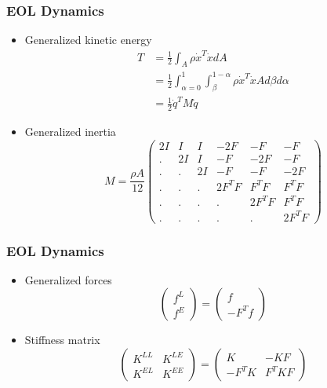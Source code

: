 \documentclass[serif,mathserif, 12pt]{beamer}
\begin{document}
\begin{frame}
  \frametitle{EOL Dynamics}
  \begin{itemize}
  \item Generalized kinetic energy
    \[
    \begin{split}
      T &= \frac{1}{2}\int_A \rho \dot x^T \dot x dA \\
      &=\frac{1}{2}\int_{\alpha=0}^1\int_{\beta}^{1-\alpha} \rho \dot x^T \dot x Ad\beta d\alpha \\
      &= \frac{1}{2} \dot q^T M \dot q
    \end{split}    
    \]
  \item Generalized inertia
    \[
    M = \frac{\rho A}{12}
    \begin{pmatrix}
      2I & I & I & -2F & -F & -F \\
      . & 2I & I & -F & -2F & -F \\
      . & . & 2I & -F & -F & -2F \\
      . & . & . & 2F^TF & F^TF & F^TF \\
      . & . & . & . & 2F^TF & F^TF \\
      . & . & . & . & . & 2F^TF
    \end{pmatrix}
     \]
  \end{itemize}
\end{frame}

\begin{frame}
  \frametitle{EOL Dynamics}
  \begin{itemize}
  \item Generalized forces
    \[
    \begin{pmatrix}
      f^L \\
      f^E
    \end{pmatrix}
    =
    \begin{pmatrix}
      f \\
      -F^Tf
    \end{pmatrix}
    \]
  \item Stiffness matrix
    \[
    \begin{pmatrix}
      K^{LL} & K^{LE} \\
      K^{EL} & K^{EE} 
    \end{pmatrix}
    =
    \begin{pmatrix}
      K & -KF \\
      -F^TK & F^TKF
    \end{pmatrix}
    \]
  \end{itemize}
\end{frame}
\end{document}
